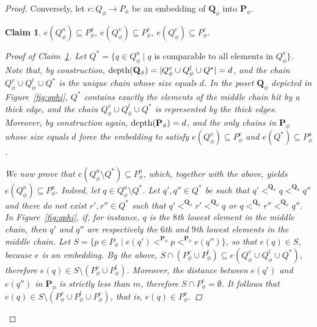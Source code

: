 \documentclass[usletter]{article}
\newcommand{\pp}{\mathbf{P}}
\newcommand{\qq}{\mathbf{Q}}
\newtheorem{claim}{Claim}
\begin{document}
{\begin{proof}
Conversely, let $e \colon Q_{\phi} \to P_{\phi}$ 
be an embedding of $\qq_{\phi}$ into $\pp_{\phi}$.  

\begin{claim}\label{claim:empart}
$e(Q_{\phi}^a) \subseteq P_{\phi}^a$, 
$e(Q_{\phi}^v) \subseteq P_{\phi}^v$, 
$e(Q_{\phi}^c) \subseteq P_{\phi}^c$. 

\begin{proof}[Proof of Claim~\ref{claim:empart}]  
Let $Q^*=\{ q \in Q_{\phi}^a \mid \text{$q$ is comparable to all elements in $Q_{\phi}^v$} \}$.  
Note that, by construction, $\textup{depth}(\qq_{\phi})=|Q_{\phi}^v \cup Q_{\phi}^l \cup Q^*|=d$, 
and the chain $Q_{\phi}^v \cup Q_{\phi}^l \cup Q^*$ is the unique chain 
whose size equals $d$.  
In the poset $\qq_{\phi}$ depicted in Figure~\ref{fig:qphi}, 
$Q^*$ contains exactly the elements of the middle chain hit by a thick edge, 
and the chain $Q_{\phi}^v \cup Q_{\phi}^l \cup Q^*$ is represented by the thick edges.  
Moreover, by construction again, $\textup{depth}(\pp_{\phi})=d$, 
and the only chains in $\pp_{\phi}$ whose size equals $d$ 
force the embedding to satisfy $e(Q_{\phi}^v) \subseteq P_{\phi}^v$ 
and $e(Q^*) \subseteq P_{\phi}^a$.  

We now prove that $e(Q_{\phi}^a \setminus Q^*) \subseteq P_{\phi}^a$, 
which, together with the above, yields $e(Q_{\phi}^a) \subseteq P_{\phi}^a$.  
Indeed, let $q \in Q_{\phi}^a \setminus Q^*$.  
Let $q',q'' \in Q^*$ be such that $q' <^{\qq_{\phi}} q <^{\qq_{\phi}} q''$ 
and there do not exist $r',r'' \in Q^*$ such that $q' <^{\qq_{\phi}} r' <^{\qq_{\phi}} q$ 
or $q <^{\qq_{\phi}} r'' <^{\qq_{\phi}} q''$.  
In Figure~\ref{fig:qphi}, if, for instance, $q$ is the $8$th lowest element in the middle chain, 
then $q'$ and $q''$ are respectively the $6$th and $9$th lowest elements in the middle chain.  
Let $S=\{ p \in P_{\phi} \mid e(q') <^{\pp_{\phi}} p <^{\pp_{\phi}} e(q'') \}$, 
so that $e(q) \in S$, because $e$ is an embedding.  By the above, 
$S \cap (P_{\phi}^v \cup P_{\phi}^l) \subseteq e(Q_{\phi}^v \cup Q_{\phi}^l \cup Q^*)$, 
therefore $e(q) \in S \setminus (P_{\phi}^v \cup P_{\phi}^l)$.  Moreover, 
the distance between $e(q')$ and $e(q'')$ in $\pp_{\phi}$ is strictly 
less than $m$, therefore $S \cap P_{\phi}^c=\emptyset$.  It follows that 
$e(q) \in S \setminus (P_{\phi}^v \cup P_{\phi}^l \cup P_{\phi}^c)$, 
that is, $e(q) \in P_{\phi}^a$.


\end{proof}
\end{claim}
\end{proof}}
\end{document}

